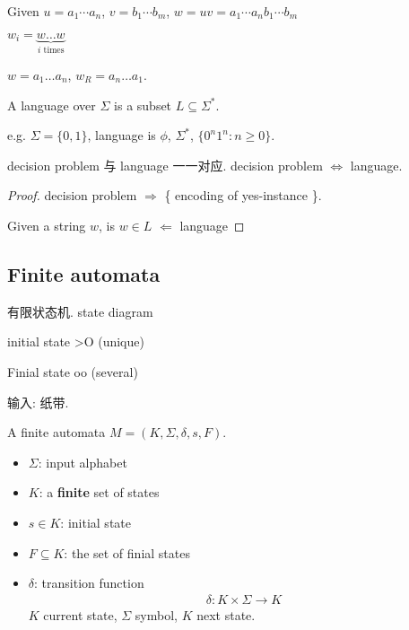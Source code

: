 \begin{definition}[Concatenation]
    Given $u=a_1\cdots a_n$, $v=b_1\cdots b_m$, $w=uv=a_1\cdots a_n b_1 \cdots b_m$
\end{definition}

\begin{definition}[exponentiation(幂)]
    $w_i=\underbrace{w\dots w}_{i \text{ times}}$
\end{definition} 

\begin{definition}[reversal]
    $w=a_1\dots a_n$, $w_R=a_n\dots a_1$. 
\end{definition}

\begin{definition}[Language]
    A language over $\Sigma$ is a subset $L \subseteq  \Sigma^*$. 
\end{definition}

e.g. $\Sigma=\{ 0,1 \}$, language is $\phi$, $\Sigma^*$, $\{ 0^n 1^n : n\ge 0 \}$. 

decision problem 与 language 一一对应. decision problem $\Leftrightarrow$ language. 
\begin{proof}
    decision problem $\Rightarrow$ \{ encoding of yes-instance \}. 

    Given a string $w$, is $w\in L$ $\Leftarrow$ language
\end{proof}

\subsection{Finite automata}
有限状态机. state diagram %

initial state >O (unique)

Finial state oo (several)

输入: 纸带. 

\begin{definition}
    A finite automata $M=(K, \Sigma, \delta, s, F)$. 
    \begin{itemize}
        \item $\Sigma$: input alphabet
        \item $K$: a \textbf{finite} set of states
        \item $s\in K$: initial state
        \item $F\subseteq K$: the set of finial states
        \item $\delta$: transition function
        \begin{align*}
            \delta: K \times \Sigma \rightarrow K
        \end{align*}
        $K$ current state, $\Sigma$ symbol, $K$ next state. 
    \end{itemize}
\end{definition}



